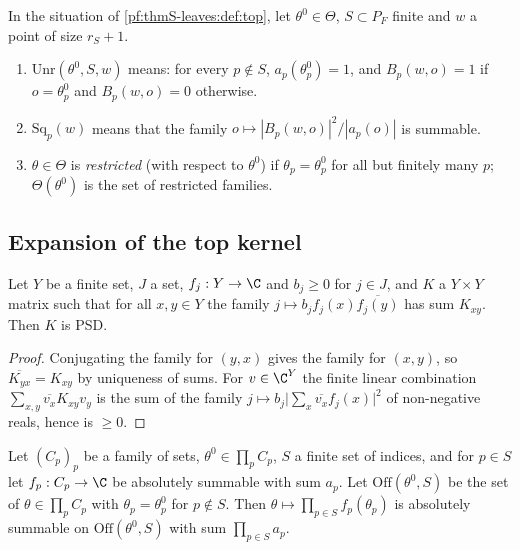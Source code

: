 \begin{definition}\label{pf:thmS-leaves:def:unram}
In the situation of \cref{pf:thmS-leaves:def:top}, let $\theta^0\in\Theta$, $S\subset P_F$ finite and $w$ a point of
size $r_S+1$.
\begin{enumerate}
\item $\mathrm{Unr}(\theta^0,S,w)$ means: for every $p\notin S$, $a_p(\theta^0_p)=1$, and $B_p(w,o)=1$ if $o=\theta^0_p$ and
$B_p(w,o)=0$ otherwise.
\item $\mathrm{Sq}_p(w)$ means that the family $o\mapsto|B_p(w,o)|^2/|a_p(o)|$ is summable.
\item $\theta\in\Theta$ is \emph{restricted} (with respect to $\theta^0$) if $\theta_p=\theta^0_p$ for all but finitely
many $p$; $\Theta(\theta^0)$ is the set of restricted families.
\end{enumerate}
\end{definition}

\subsection{Expansion of the top kernel}\label{pf:thmS-leaves:ss:expansion}

\begin{lemma}\label{pf:thmS-leaves:lem:psdsum}
Let $Y$ be a finite set, $J$ a set, $f_j:Y\to\C$ and $b_j\ge0$ for $j\in J$, and $K$ a $Y\times Y$ matrix such
that for all $x,y\in Y$ the family $j\mapsto b_jf_j(x)\overline{f_j(y)}$ has sum $K_{xy}$. Then $K$ is PSD.
\end{lemma}

\begin{proof}
Conjugating the family for $(y,x)$ gives the family for $(x,y)$, so $\overline{K_{yx}}=K_{xy}$ by uniqueness of
sums. For $v\in\C^Y$ the finite linear combination $\sum_{x,y}\overline{v_x}K_{xy}v_y$ is the sum of the family
$j\mapsto b_j\bigl|\sum_x\overline{v_x}f_j(x)\bigr|^2$ of non-negative reals, hence is $\ge0$.
\end{proof}

\begin{lemma}\label{pf:thmS-leaves:lem:prodsum}
Let $(C_p)_{p}$ be a family of sets, $\theta^0\in\prod_pC_p$, $S$ a finite set of indices, and for $p\in S$ let
$f_p:C_p\to\C$ be absolutely summable with sum $a_p$. Let $\mathrm{Off}(\theta^0,S)$ be the set of
$\theta\in\prod_pC_p$ with $\theta_p=\theta^0_p$ for $p\notin S$. Then $\theta\mapsto\prod_{p\in S}f_p(\theta_p)$ is
absolutely summable on $\mathrm{Off}(\theta^0,S)$ with sum $\prod_{p\in S}a_p$.
\end{lemma}

